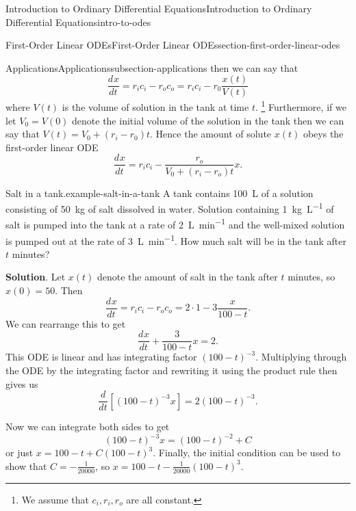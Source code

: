 \documentclass[oneside,10pt,]{book}
\numberwithin{equation}{section}
\newcommand{\dv}[3][]{\dfrac{d^{#1} #2}{d #3^{#1}}}
\begin{document}
\begin{chapterptx}{Introduction to Ordinary Differential Equations}{}{Introduction to Ordinary Differential Equations}{}{}{intro-to-odes}
\begin{sectionptx}{First-Order Linear ODEs}{}{First-Order Linear ODEs}{}{}{section-first-order-linear-odes}
\begin{subsectionptx}{Applications}{}{Applications}{}{}{subsection-applications}
then we can say that%
\begin{equation*}
\dv{x}{t} = r_{i}c_{i} - r_{o}c_{o} = r_{i}c_{i} - r_{0}\frac{x(t)}{V(t)}
\end{equation*}
where \(V(t)\) is the volume of solution in the tank at time \(t\). \footnote{We assume that \(c_{i},r_{i},r_{o}\) are all constant.\label{fn-4}} Furthermore, if we let \(V_{0} = V(0)\) denote the initial volume of the solution in the tank then we can say that \(V(t) = V_{0} + (r_{i}-r_{0})t.\) Hence the amount of solute \(x(t)\) obeys the first-order linear ODE%
\begin{equation*}
\dv{x}{t} = r_{i}c_{i} - \frac{r_{o}}{V_{0}+(r_{i}-r_{o})t}x.
\end{equation*}
%
\begin{example}{Salt in a tank.}{example-salt-in-a-tank}%
\hypertarget{p-87}{}%
A tank contains \SI{100}{\liter} of a solution consisting of \SI{50}{\kilo\gram} of salt dissolved in water. Solution containing \SI{1}{\kilo\gram\per\liter} of salt is pumped into the tank at a rate of \SI{2}{\liter\per\minute} and the well-mixed solution is pumped out at the rate of \SI{3}{\liter\per\minute}. How much salt will be in the tank after \(t\) minutes?%
\par\smallskip%
\noindent\textbf{Solution}.\hypertarget{solution-15}{}\quad%
\hypertarget{p-88}{}%
Let \(x(t)\) denote the amount of salt in the tank after \(t\) minutes, so \(x(0) = 50\). Then%
\begin{equation*}
\dv{x}{t} = r_{i}c_{i}-r_{o}c_{o} = 2\cdot1-3\frac{x}{100-t}.
\end{equation*}
We can rearrange this to get%
\begin{equation*}
\dv{x}{t} + \frac{3}{100-t}x = 2.
\end{equation*}
This ODE is linear and has integrating factor \((100-t)^{-3}\). Multiplying through the ODE by the integrating factor and rewriting it using the product rule then gives us%
\begin{equation*}
\dv{}{t}[(100-t)^{-3}x] = 2(100-t)^{-3}.
\end{equation*}
%
\par
\hypertarget{p-89}{}%
Now we can integrate both sides to get%
\begin{equation*}
(100-t)^{-3}x = (100-t)^{-2}+C
\end{equation*}
or just \(x = 100-t+C(100-t)^{3}\). Finally, the initial condition can be used to show that \(C = -\frac{1}{20000}\), so \(x = 100-t - \frac{1}{20000}(100-t)^{3}\).%
\end{example}

\end{subsectionptx}
\end{sectionptx}
\end{chapterptx}
\end{document}
